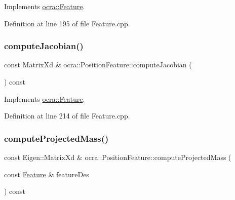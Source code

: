 Implements \hyperlink{classocra_1_1Feature_a4fb8eeeed978a1f727ec43cd1bd18d78}{ocra\+::\+Feature}.



Definition at line 195 of file Feature.\+cpp.

\hypertarget{classocra_1_1PositionFeature_a15ec85661a0c18620f9214a375066cdd}{}\label{classocra_1_1PositionFeature_a15ec85661a0c18620f9214a375066cdd} 
\subsubsection{\texorpdfstring{compute\+Jacobian()}{computeJacobian()}\hspace{0.1cm}{\footnotesize\ttfamily [2/2]}}
{\footnotesize\ttfamily const Matrix\+Xd \& ocra\+::\+Position\+Feature\+::compute\+Jacobian (\begin{DoxyParamCaption}{ }\end{DoxyParamCaption}) const\hspace{0.3cm}{\ttfamily [virtual]}}



Implements \hyperlink{classocra_1_1Feature_adbab3b388657555abb805bb971c2491f}{ocra\+::\+Feature}.



Definition at line 214 of file Feature.\+cpp.

\hypertarget{classocra_1_1PositionFeature_a093701bd80310d92ea3d3f81c9ea629a}{}\label{classocra_1_1PositionFeature_a093701bd80310d92ea3d3f81c9ea629a} 
\subsubsection{\texorpdfstring{compute\+Projected\+Mass()}{computeProjectedMass()}\hspace{0.1cm}{\footnotesize\ttfamily [1/2]}}
{\footnotesize\ttfamily const Eigen\+::\+Matrix\+Xd \& ocra\+::\+Position\+Feature\+::compute\+Projected\+Mass (\begin{DoxyParamCaption}\item[{const \hyperlink{classocra_1_1Feature}{Feature} \&}]{feature\+Des }\end{DoxyParamCaption}) const\hspace{0.3cm}{\ttfamily [virtual]}}



